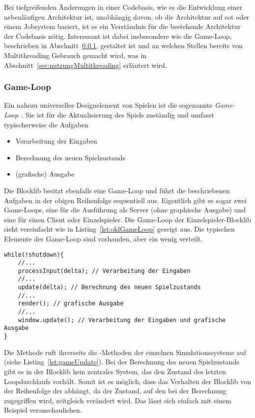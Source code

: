 Bei tiefgreifenden Änderungen in einer Codebasis, wie es die Entwicklung einer nebenläufigen Architektur ist, unabhängig davon, ob die Architektur auf \ac{sot} oder einem Jobsystem basiert, ist es ein Verständnis für die bestehende Architektur der Codebasis nötig. Interessant ist dabei insbesondere wie die Game-Loop, beschrieben in Abschnitt~\ref{sec:gameLoop}, gestaltet ist und an welchen Stellen bereits von Multithreading Gebrauch gemacht wird, was in Abschnitt~\ref{sec:nutzungMultithreading} erläutert wird.

\subsubsection{Game-Loop}\label{sec:gameLoop}
Ein nahezu universelles Designelement von Spielen ist die sogenannte \emph{Game-Loop}~\cite[S.~161~ff.]{Nystrom2015}. Sie ist für die Aktualisierung des Spiels zuständig und umfasst typischerweise die Aufgaben 
\begin{itemize}
  \item Verarbeitung der Eingaben
  \item Berechnung des neuen Spielzustands
  \item (grafische) Ausgabe
\end{itemize}
Die Blocklib besitzt ebenfalls eine Game-Loop und führt die beschriebenen Aufgaben in der obigen Reihenfolge sequentiell aus. Eigentlich gibt es sogar zwei Game-Loops, eine für die Ausführung als Server (ohne graphische Ausgabe) und eine für einen Client oder Einzelspieler. Die Game-Loop der Einzelspieler-Blocklib sieht vereinfacht wie in Listing~\ref{lst:oldGameLoop} gezeigt aus. Die typischen Elemente der Game-Loop sind vorhanden, aber ein wenig verteilt.

\begin{lstlisting}[caption={Vereinfachte Version der Blocklib für Einzelspieler.},label={lst:oldGameLoop},float]
while(!shutdown){
	//...
	processInput(delta); // Verarbeitung der Eingaben
	//...
	update(delta); // Berechnung des neuen Spielzustands
	//...
	render(); // grafische Ausgabe
	//...
	window.update(); // Verarbeitung der Eingaben und grafische Ausgabe
}
\end{lstlisting}

Die Methode  ruft ihrerseits die -Methoden der einzelnen Simulationssysteme auf (siehe Listing~\ref{lst:gameUpdate}).
Bei der Berechnung des neuen Spielzustands gibt es in der Blocklib kein zentrales System, das den Zustand des letzten Loopdurchlaufs vorhält. Somit ist es möglich, dass das Verhalten der Blocklib von der Reihenfolge der  abhängt, da der Zustand, auf den bei der Berechnung zugegriffen wird, zeitgleich verändert wird. Das lässt sich einfach mit einem Beispiel veranschaulichen. 


